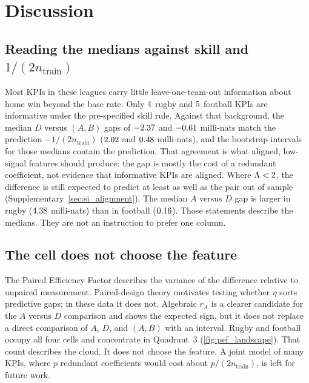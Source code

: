 \section{Discussion}
\label{sec:discussion}

\subsection{Reading the medians against skill and \texorpdfstring{$1/(2n_{\mathrm{train}})$}{1/(2n)}}

Most KPIs in these leagues carry little leave-one-team-out information about home win beyond the base rate.
Only $4$ rugby and $5$ football KPIs are informative under the pre-specified skill rule.
Against that background, the median $D$ versus $(A,B)$ gaps of $-2.37$ and $-0.61$ milli-nats match the prediction $-1/(2n_{\mathrm{train}})$ ($2.02$ and $0.48$ milli-nats), and the bootstrap intervals for those medians contain the prediction.
That agreement is what aligned, low-signal features should produce: the gap is mostly the cost of a redundant coefficient, not evidence that informative KPIs are aligned.
Where $\Lambda<2$, the difference is still expected to predict at least as well as the pair out of sample (Supplementary~\cref{sec:si_alignment}).
The median $A$ versus $D$ gap is larger in rugby ($4.38$ milli-nats) than in football ($0.16$).
Those statements describe the medians.
They are not an instruction to prefer one column.

\subsection{The cell does not choose the feature}

The Paired Efficiency Factor describes the variance of the difference relative to unpaired measurement.
Paired-design theory motivates testing whether $\eta$ sorts predictive gaps; in these data it does not.
Algebraic $r_A$ is a clearer candidate for the $A$ versus $D$ comparison and shows the expected sign, but it does not replace a direct comparison of $A$, $D$, and $(A,B)$ with an interval.
Rugby and football occupy all four cells and concentrate in Quadrant~3 (\cref{fig:pef_landscape}).
That count describes the cloud.
It does not choose the feature.
A joint model of many KPIs, where $p$ redundant coefficients would cost about $p/(2n_{\mathrm{train}})$, is left for future work.

